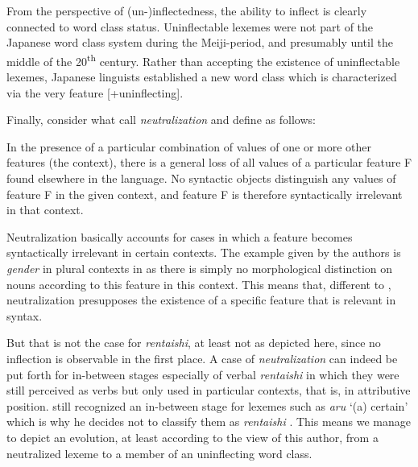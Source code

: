 \documentclass[output=paper,colorlinks,citecolor=brown]{langscibook}
\begin{document}
From the perspective of (un-)inflectedness, the ability to inflect is clearly connected to word class status. Uninflectable lexemes were not part of the Japanese word class system during the Meiji-period, and presumably until the middle of the 20\textsuperscript{th} century. Rather than accepting the existence of uninflectable lexemes, Japanese linguists established a new word class which is characterized via the very feature [+uninflecting].

Finally, consider what \citet{baermanbrowncorbett2005} call \emph{neutralization} and define as follows:

\begin{exe}
	\ex \label{12ex39}
	\begin{xlist}
		 In the presence of a particular combination of values of one or more other features (the context), there is a general loss of all values of a particular feature F found elsewhere in the language.
		 No syntactic objects distinguish any values of feature F in the given context, and feature F is therefore syntactically irrelevant in that context.
	\end{xlist}
	\hfill \citep[30]{baermanbrowncorbett2005}
\end{exe}

Neutralization basically accounts for cases in which a feature becomes syntactically irrelevant in certain contexts. The example given by the authors is \emph{gender} in plural contexts in  \citep[28]{baermanbrowncorbett2005} as there is simply no morphological distinction on nouns according to this feature in this context. This means that, different to , neutralization presupposes the existence of a specific feature that is relevant in syntax.

But that is not the case for \emph{rentaishi}, at least not as depicted here, since no inflection is observable in the first place. A case of \emph{neutralization} can indeed be put forth for in-between stages especially of verbal \emph{rentaishi} in which they were still perceived as verbs but only used in particular contexts, that is, in attributive position. \citet[356--359]{kieda1938} still recognized an in-between stage for lexemes such as \emph{aru} `(a) certain' which is why he decides not to classify them as \emph{rentaishi} \citep[359]{kieda1938}. This means we manage to depict an evolution, at least according to the view of this author, from a neutralized lexeme to a member of an uninflecting word class.
\end{document}

